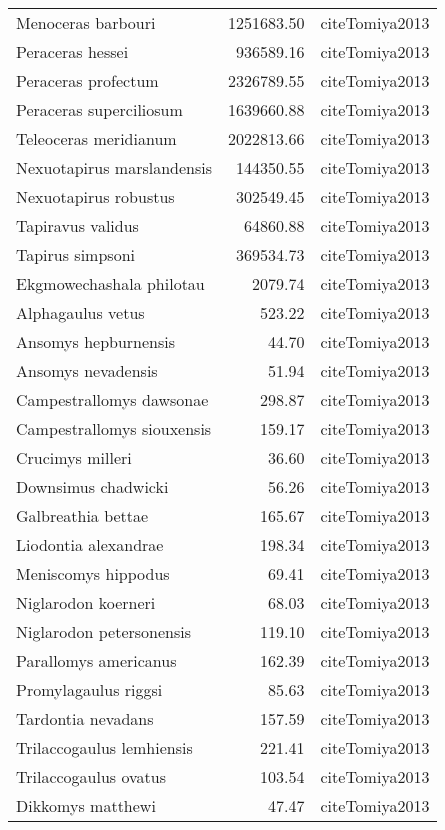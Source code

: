 \begin{table}[ht]
\begin{tabular}{lrl}
  Menoceras barbouri & 1251683.50 & cite{Tomiya2013} \\ 
  Peraceras hessei & 936589.16 & cite{Tomiya2013} \\ 
  Peraceras profectum & 2326789.55 & cite{Tomiya2013} \\ 
  Peraceras superciliosum & 1639660.88 & cite{Tomiya2013} \\ 
  Teleoceras meridianum & 2022813.66 & cite{Tomiya2013} \\ 
  Nexuotapirus marslandensis & 144350.55 & cite{Tomiya2013} \\ 
  Nexuotapirus robustus & 302549.45 & cite{Tomiya2013} \\ 
  Tapiravus validus & 64860.88 & cite{Tomiya2013} \\ 
  Tapirus simpsoni & 369534.73 & cite{Tomiya2013} \\ 
  Ekgmowechashala philotau & 2079.74 & cite{Tomiya2013} \\ 
  Alphagaulus vetus & 523.22 & cite{Tomiya2013} \\ 
  Ansomys hepburnensis & 44.70 & cite{Tomiya2013} \\ 
  Ansomys nevadensis & 51.94 & cite{Tomiya2013} \\ 
  Campestrallomys dawsonae & 298.87 & cite{Tomiya2013} \\ 
  Campestrallomys siouxensis & 159.17 & cite{Tomiya2013} \\ 
  Crucimys milleri & 36.60 & cite{Tomiya2013} \\ 
  Downsimus chadwicki & 56.26 & cite{Tomiya2013} \\ 
  Galbreathia bettae & 165.67 & cite{Tomiya2013} \\ 
  Liodontia alexandrae & 198.34 & cite{Tomiya2013} \\ 
  Meniscomys hippodus & 69.41 & cite{Tomiya2013} \\ 
  Niglarodon koerneri & 68.03 & cite{Tomiya2013} \\ 
  Niglarodon petersonensis & 119.10 & cite{Tomiya2013} \\ 
  Parallomys americanus & 162.39 & cite{Tomiya2013} \\ 
  Promylagaulus riggsi & 85.63 & cite{Tomiya2013} \\ 
  Tardontia nevadans & 157.59 & cite{Tomiya2013} \\ 
  Trilaccogaulus lemhiensis & 221.41 & cite{Tomiya2013} \\ 
  Trilaccogaulus ovatus & 103.54 & cite{Tomiya2013} \\ 
  Dikkomys matthewi & 47.47 & cite{Tomiya2013} \\ 

\end{tabular}
\end{table}
